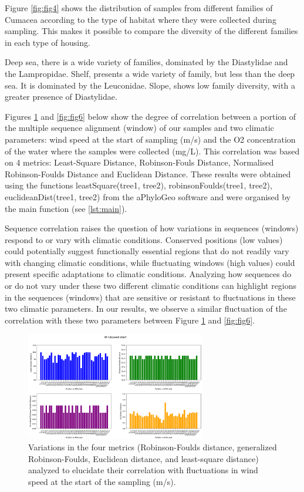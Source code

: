 Figure \ref{fig:fig4} shows the distribution of samples from different families of Cumacea according to the type of habitat where they were collected during sampling. This makes it possible to compare the diversity of the different families in each type of housing.

Deep sea, there is a wide variety of families, dominated by the Diastylidae and the Lampropidae. Shelf, presents a wide variety of family, but less than the deep sea. It is dominated by the Leuconidae. Slope, shows low family diversity, with a greater presence of Diastylidae. 

Figures \ref{fig:fig5} and \ref{fig:fig6} below show the degree of correlation between a portion of the multiple sequence alignment (window) of our samples and two climatic parameters: wind speed at the start of sampling (m/s) and the O2 concentration of the water where the samples were collected (mg/L). This correlation was based on 4 metrics: Least-Square Distance, Robinson-Fouls Distance, Normalised Robinson-Foulds Distance and Euclidean Distance. These results were obtained using the functions leastSquare(tree1, tree2), robinsonFoulds(tree1, tree2), euclideanDist(tree1, tree2) from the aPhyloGeo software and were organised by the main function (see \autoref{lst:main}). 

Sequence correlation raises the question of how variations in sequences (windows) respond to or vary with climatic conditions. Conserved positions (low values) could potentially suggest functionally essential regions that do not readily vary with changing climatic conditions, while fluctuating windows (high values) could present specific adaptations to climatic conditions. Analyzing how sequences do or do not vary under these two different climatic conditions can highlight regions in the sequences (windows) that are sensitive or resistant to fluctuations in these two climatic parameters. In our results, we observe a similar fluctuation of the correlation with these two parameters between Figure \ref{fig:fig5} and \ref{fig:fig6}.

\begin{figure}[]
    \centering
    \includegraphics[width=0.7\textwidth]{figure5.png}
    \caption{Variations in the four metrics (Robinson-Foulds distance, generalized Robinson-Foulds, Euclidean distance, and least-square distance) analyzed to elucidate their correlation with fluctuations in wind speed at the start of the sampling (m/s). \label{fig:fig5}}
\end{figure}

